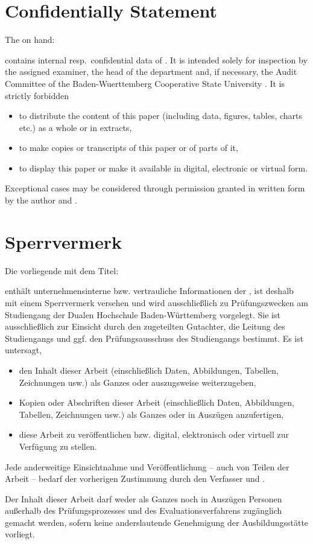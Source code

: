 
{
	\chapter*{Confidentially Statement}
	The {\arbeit} on hand:
	\begin{quote}
		\textit{\titel}
	\end{quote}
 	contains internal resp.\ confidential data of {\firmaName}. It is intended solely for inspection by the assigned examiner, the head of the {\studiengang} department and, if necessary, the Audit Committee of the Baden-Wuerttemberg Cooperative State University \abgabeOrt. It is strictly forbidden
  	\begin{itemize}
		\item to distribute the content of this paper (including data, figures, tables, charts etc.) as a whole or in extracts,
		\item to make copies or transcripts of this paper or of parts of it,
		\item to display this paper or make it available in digital, electronic or virtual form.
  	\end{itemize}
	Exceptional cases may be considered through permission granted in written form by the author and {\firmaName}.
}
{
	\chapter*{Sperrvermerk}
	{
		Die vorliegende {\arbeit} mit dem Titel: 
		\begin{quote}
			\textit{\titel}
		\end{quote}
		enthält unternehmensinterne bzw. vertrauliche Informationen der {\firmaName}, ist deshalb mit einem Sperrvermerk versehen und wird ausschließlich zu Prüfungszwecken am Studiengang {\studiengang} der Dualen Hochschule Baden-Württemberg {\abgabeOrt} vorgelegt. Sie ist ausschließlich zur Einsicht durch den zugeteilten Gutachter, die Leitung des Studiengangs und ggf. den Prüfungsausschuss des Studiengangs bestimmt.  Es ist untersagt,
		\begin{itemize}
			\item den Inhalt dieser Arbeit (einschließlich Daten, Abbildungen, Tabellen, Zeichnungen usw.) als Ganzes oder auszugsweise weiterzugeben,
			\item Kopien oder Abschriften dieser Arbeit (einschließlich Daten, Abbildungen, Tabellen, Zeichnungen usw.) als Ganzes oder in Auszügen anzufertigen,
			\item diese Arbeit zu veröffentlichen bzw. digital, elektronisch oder virtuell zur Verfügung zu stellen. 
		\end{itemize}
		Jede anderweitige Einsichtnahme und Veröffentlichung – auch von Teilen der Arbeit – bedarf der vorherigen Zustimmung durch den Verfasser und {\firmaName}.
	}
	{
		Der Inhalt dieser Arbeit darf weder als Ganzes noch in Auszügen Personen außerhalb des Prüfungsprozesses und des Evaluationsverfahrens zugänglich gemacht werden, sofern keine anderslautende Genehmigung der Ausbildungsstätte vorliegt.
	}
}